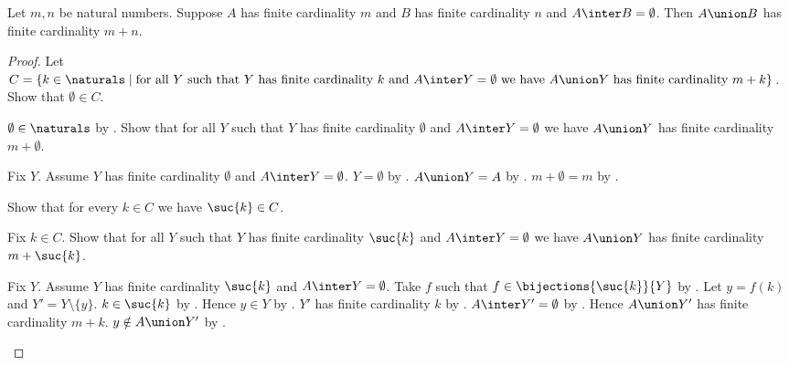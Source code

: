 \begin{theorem}\label{finite_cardinality_disjoint_union}
    Let $m,n$ be natural numbers.
    Suppose $A$ has finite cardinality $m$ and
        $B$ has finite cardinality $n$ and $A\inter B=\emptyset$.
    Then $A\union B$ has finite cardinality $m+n$.
\end{theorem}
\begin{proof}
    Let $C=\{k\in\naturals\mid
        \text{for all $Y$ such that $Y$ has finite cardinality $k$ and
            $A\inter Y=\emptyset$ we have
            $A\union Y$ has finite cardinality $m+k$}\}$.
    Show that $\emptyset\in C$.
    \begin{subproof}
        $\emptyset\in\naturals$ by .
        Show that for all $Y$ such that
            $Y$ has finite cardinality $\emptyset$ and
            $A\inter Y=\emptyset$ we have
            $A\union Y$ has finite cardinality $m+\emptyset$.
        \begin{subproof}
            Fix $Y$.
            Assume $Y$ has finite cardinality $\emptyset$ and
                $A\inter Y=\emptyset$.
            $Y=\emptyset$ by .
            $A\union Y=A$ by .
            $m+\emptyset=m$ by .
        \end{subproof}
    \end{subproof}
    Show that for every $k\in C$ we have $\suc{k}\in C$.
    \begin{subproof}
        Fix $k\in C$.
        Show that for all $Y$ such that
            $Y$ has finite cardinality $\suc{k}$ and
            $A\inter Y=\emptyset$ we have
            $A\union Y$ has finite cardinality $m+\suc{k}$.
        \begin{subproof}
            Fix $Y$.
            Assume $Y$ has finite cardinality $\suc{k}$ and
                $A\inter Y=\emptyset$.
            Take $f$ such that $f\in\bijections{\suc{k}}{Y}$ by
                .
            Let $y=f(k)$ and $Y'=Y\setminus\{y\}$.
            $k\in\suc{k}$ by .
            Hence $y\in Y$ by
                .
            $Y'$ has finite cardinality $k$ by
                .
            $A\inter Y'=\emptyset$ by
                .
            Hence $A\union Y'$ has finite cardinality $m+k$.
            $y\notin A\union Y'$ by
                .

\end{subproof}
\end{subproof}
\end{proof}
